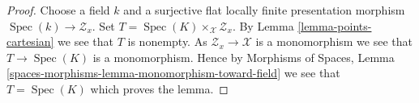 \documentclass[10pt,a4paper]{amsart}
\theoremstyle{plain}
\theoremstyle{definition}
\theoremstyle{remark}
\numberwithin{equation}{subsection}
\def\Spec{\mathop{\mathrm{Spec}}}
\begin{document}
\begin{proof}
Choose a field $k$ and a surjective flat locally finite presentation
morphism $\Spec(k) \to \mathcal{Z}_x$. Set
$T = \Spec(K) \times_\mathcal{X} \mathcal{Z}_x$. By
Lemma \ref{lemma-points-cartesian}
we see that $T$ is nonempty. As $\mathcal{Z}_x \to \mathcal{X}$
is a monomorphism we see that $T \to \Spec(K)$ is a monomorphism.
Hence by
Morphisms of Spaces, Lemma
\ref{spaces-morphisms-lemma-monomorphism-toward-field}
we see that $T = \Spec(K)$ which proves the lemma.
\end{proof}
\end{document}

